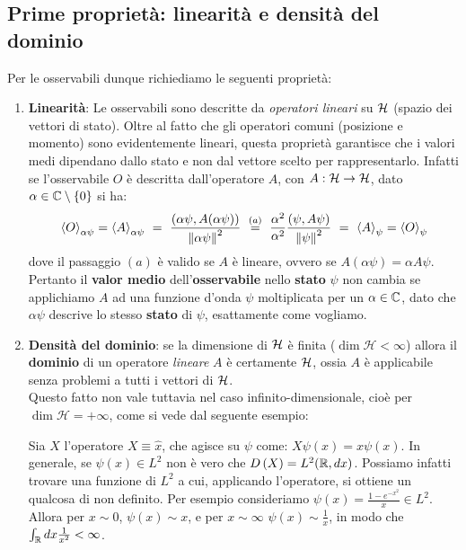 \documentclass[FisicaTeorica.tex]{subfiles}
\begin{document}
\subsection{Prime proprietà: linearità e densità del dominio}
Per le osservabili dunque richiediamo le seguenti proprietà:
\begin{enumerate}
    \item \textbf{Linearità}: Le osservabili sono descritte da \emph{operatori lineari} su $\mathcal{H}$ (spazio dei vettori di stato).
    Oltre al fatto che gli operatori comuni (posizione e momento) sono evidentemente lineari, questa proprietà garantisce che i valori medi dipendano dallo stato e non dal vettore scelto per rappresentarlo. Infatti se l'osservabile $O$ è descritta dall'operatore $A$, con $A:\mathcal{H} \to \mathcal{H}$, dato $\alpha \in \mathbb{C}\setminus \{0\}$ si ha: 
    \[
    \avg{O}_{\alpha \psi} = \avg{A}_{\alpha \psi}  \ = \ \frac{(\alpha\psi,A(\alpha\psi))}{\norm{\alpha\psi}^2} \ \overset{(a)}{=} \ \frac{\alpha^2}{\alpha^2} \frac{(\psi,A\psi)}{\norm{\psi}^2} \ = \ \avg{A}_\psi = \avg{O}_\psi
    \]
    dove il passaggio $(a)$ è valido se $A$ è lineare, ovvero se $A(\alpha \psi) = \alpha A\psi$. 
    Pertanto il \textbf{valor medio} dell'\textbf{osservabile} nello \textbf{stato} $\psi$ non cambia se applichiamo $A$ ad una funzione d'onda $\psi$ moltiplicata per un $\alpha \in \mathbb{C}$, dato che $\alpha\psi$ descrive lo stesso \textbf{stato} di $\psi$, esattamente come vogliamo.
	\item \textbf{Densità del dominio}:  se la dimensione di $\mathcal{H}$ è finita ($\dim{\mathcal{H}<\infty}$) allora il \textbf{dominio} di un operatore \textit{lineare} $A$ è certamente $\mathcal{H}$, ossia $A$ è applicabile senza problemi a tutti i vettori di $\mathcal{H}$.\\
	Questo fatto non vale tuttavia nel caso infinito-dimensionale, cioè per $\dim{\mathcal{H}=+\infty}$, come si vede dal seguente esempio:
	\begin{es} Sia $X$ l'operatore  $X\equiv \hat{x}$, che agisce su $\psi$ come: $X\psi \left(x\right)=x\psi \left(x\right)$.
	In generale, se $\psi \left(x\right)\in L^2$ non è vero che $D\left(X\right)=L^2(\mathbb{R}, dx)$.
	Possiamo infatti trovare una funzione di $L^2$ a cui, applicando l'operatore, si ottiene un qualcosa di non definito. Per esempio consideriamo $\psi \left(x\right)=\frac{1-e^{-x^2}}{x}\in L^2$. Allora per $x\sim 0$, $\psi \left(x\right)\sim x$, e per $x\sim \infty$  $\psi \left(x\right)\sim \frac{1}{x}$, in modo che $\int_{\mathbb{R}} dx \frac{1}{x^2}<\infty$.

\end{es}
\end{enumerate}
\end{document}
